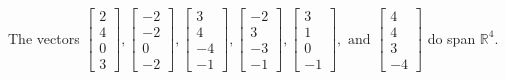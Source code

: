\begin{exercise}
\begin{exerciseStatement}
  \end{exerciseStatement}
  \begin{exerciseAnswer}
   The vectors \(\left[\begin{array}{r}
2 \\
4 \\
0 \\
3
\end{array}\right] , \left[\begin{array}{r}
-2 \\
-2 \\
0 \\
-2
\end{array}\right] , \left[\begin{array}{r}
3 \\
4 \\
-4 \\
-1
\end{array}\right] , \left[\begin{array}{r}
-2 \\
3 \\
-3 \\
-1
\end{array}\right] , \left[\begin{array}{r}
3 \\
1 \\
0 \\
-1
\end{array}\right] , \text{ and } \left[\begin{array}{r}
4 \\
4 \\
3 \\
-4
\end{array}\right]\) 
  	 do  
	span \(\mathbb{R}^4\).
  


  \end{exerciseAnswer}
\end{exercise}